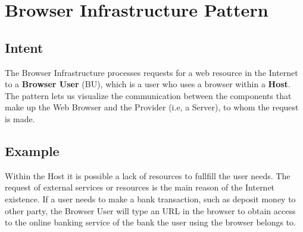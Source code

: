 \documentclass{sig-alternate-05-2015}
\begin{document}



\section*{Browser Infrastructure Pattern}

  \subsection*{Intent}
  The Browser Infrastructure processes requests for a web resource in the Internet to a \textbf{Browser User} (BU), which is a user who uses a browser within a \textbf{Host}. The pattern lets us visualize the communication between the components that make up the Web Browser and the Provider (i.e, a Server), to whom the request is made.

  \subsection*{Example}
  Within the Host it is possible a lack of resources to fullfill the user needs. The request of external services or resources is the main reason of the Internet existence. If a user needs to make a bank transaction, such as deposit money to other party, the Browser User will type an URL in the browser to obtain access to the online banking service of the bank the user using the browser belongs to.
  
\end{document}
